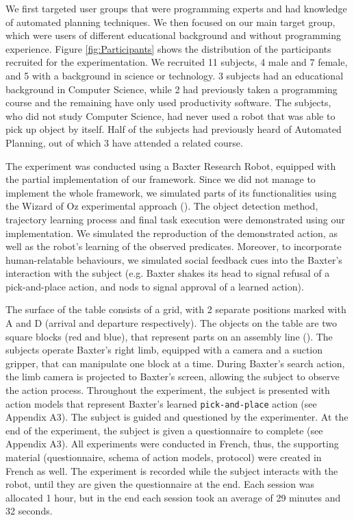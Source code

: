 We first targeted user groups that were programming experts and had knowledge of automated planning techniques. We then focused on our main target group, which were users of different educational background and without programming experience.
Figure \ref{fig:Participants} shows the distribution of the participants recruited for the experimentation.
We recruited 11 subjects, 4 male and 7 female, and 5 with a background in science or technology. 3 subjects had an educational background in Computer Science, while 2 had previously taken a programming course and the remaining have only used productivity software. The subjects, who did not study Computer Science, had never used a robot that was able to pick up object by itself. Half of the subjects had previously heard of Automated Planning, out of which 3 have attended a related course.

The experiment was conducted using a Baxter Research Robot, equipped with the partial implementation of our framework. Since we did not manage to implement the whole framework, we simulated parts of its functionalities using the Wizard of Oz experimental approach (\cite{kelley1985cal}). The object detection method, trajectory learning process and final task execution were demonstrated using our implementation. We simulated the reproduction of the demonstrated action, as well as the robot's learning of the observed predicates. Moreover, to incorporate human-relatable behaviours, we simulated social feedback cues into the Baxter's interaction with the subject (e.g. Baxter shakes its head to signal refusal of a pick-and-place action, and nods to signal approval of a learned action).

The surface of the table consists of a grid, with 2 separate positions marked with A and D (arrival and departure respectively). The objects on the table are two square blocks (red and blue), that represent parts on an assembly line (). The subjects operate Baxter's right limb, equipped with a camera and a suction gripper, that can manipulate one block at a time. During Baxter's search action, the limb camera is projected to Baxter's screen, allowing the subject to observe the action process. Throughout the experiment, the subject is presented with action models that represent Baxter's learned \texttt{pick-and-place} action (see Appendix A3). The subject is guided and questioned by the experimenter. At the end of the experiment, the subject is given a questionnaire to complete (see Appendix A3). All experiments were conducted in French, thus, the supporting material (questionnaire, schema of action models, protocol) were created in French as well. The experiment is recorded while the subject interacts with the robot, until they are given the questionnaire at the end. Each session was allocated 1 hour, but in the end each session took an average of 29 minutes and 32 seconds.

